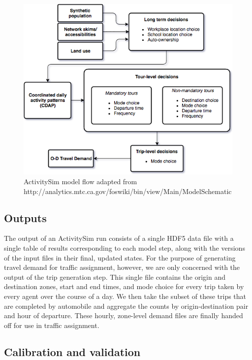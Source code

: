 \begin{figure}[htbp]
    \center
    \includegraphics[width=\textwidth]{graphics/asim_flow.png}
    \caption{ActivitySim model flow adapted from http://analytics.mtc.ca.gov/foswiki/bin/view/Main/ModelSchematic}
    \label{fig:asim-models}
\end{figure}

\subsection{Outputs}

The output of an ActivitySim run consists of a single HDF5 data file with a single table of results corresponding to each model step, along with the versions of the input files in their final, updated states. For the purpose of generating travel demand for traffic assignment, however, we are only concerned with the output of the trip generation step. This single file contains the origin and destination zones, start and end times, and mode choice for every trip taken by every agent over the course of a day. We then take the subset of these trips that are completed by automobile and aggregate the counts by origin-destination pair and hour of departure. These hourly, zone-level demand files are finally handed off for use in traffic assignment.

\subsection{Calibration and validation}
